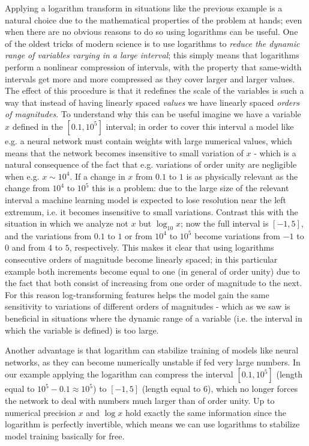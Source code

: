 Applying a logarithm transform in situations like the previous example is a natural choice due to the mathematical properties of the problem at hands; even when there are no obvious reasons to do so using logarithms can be useful.
One of the oldest tricks of modern science is to use logarithms to \emph{reduce the dynamic range of variables varying in a large interval}; this simply means that logarithms perform a nonlinear compression of intervals, with the property that same-width intervals get more and more compressed as they cover larger and larger values. The effect of this procedure is that it redefines the scale of the variables is such a way that instead of having linearly spaced \emph{values} we have linearly spaced \emph{orders of magnitudes}. 
To understand why this can be useful imagine we have a variable $x$ defined in the $[0.1, 10^5]$ interval; in order to cover this interval a model like e.g. a neural network must contain weights with large numerical values, which means that the network becomes insensitive to small variation of $x$ - which is a natural consequence of the fact that e.g. variations of order unity are negligible when e.g. $x \sim 10^4$. If a change in $x$ from $0.1$ to $1$ is as physically relevant as the change from $10^4$ to $10^5$ this is a problem: due to the large size of the relevant interval a machine learning model is expected to lose resolution near the left extremum, i.e. it becomes insensitive to small variations.
Contrast this with the situation in which we analyze not $x$ but $\log_{10}x$; now the full interval is $[-1, 5]$, and the variations from $0.1$ to $1$ or from $10^4$ to $10^5$ become variations from $-1$ to $0$ and from $4$ to $5$, respectively. This makes it clear that using logarithms consecutive orders of magnitude become linearly spaced; in this particular example both increments become equal to one (in general of order unity) due to the fact that both consist of increasing from one order of magnitude to the next. For this reason log-transforming features helps the model gain the same sensitivity to variations of different orders of magnitudes - which as we saw is beneficial in situations where the dynamic range of a variable (i.e. the interval in which the variable is defined) is too large.

Another advantage is that logarithm can stabilize training of models like neural networks, as they can become numerically unstable if fed very large numbers. In our example applying the logarithm can compress the interval $[0.1, 10^5]$ (length equal to $10^5-0.1\approx 10^5$) to $[-1, 5]$ (length equal to 6), which no longer forces the network to deal with numbers much larger than of order unity. Up to numerical precision $x$ and $\log x$ hold exactly the same information since the logarithm is perfectly invertible, which means we can use logarithms to stabilize model training basically for free.


